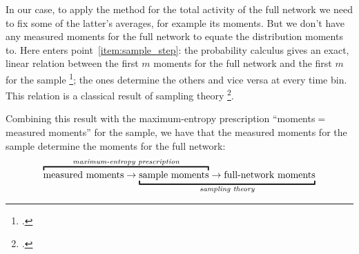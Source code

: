 \documentclass[\ifafour a4paper,12pt,\else a5paper,10pt,\fi%
onecolumn,oneside,article,%
british%
]{memoir}
\theoremstyle{remark}
\theoremstyle{innote}
\newcommand*{\citep}{\footcites}
\renewcommand*{\|}[1][]{\nonscript\,#1\vert\nonscript\;\mathopen{}}
\newcommand*{\chap}{ch.}%
\newcommand*{\chaps}{chs}%
\newcommand*{\eqns}{eqs}%
\begin{document}
In our case, to apply the method for the total activity of the full network
we need to fix some of the latter's averages, for example its moments. But
we don't have any measured moments for the full network to equate the
distribution moments to. Here enters point~\ref{item:sample_step}: the
probability calculus gives an exact, linear relation between the first $m$
moments for the full network and the first $m$ for the sample
\citep[\eqns~(16)]{portamanaetal2015}; the ones determine the others and
vice versa at every time bin. This relation is a classical result of
sampling theory
\citep[\chaps~I--IV]{whitworth1867_r1965}[\chap~II]{feller1950_r1968}[\chap~3]{jaynes1994_r2003}[see
also][]{whitworth1897}.

Combining this result with the maximum-entropy prescription
\enquote{moments${}={}$measured moments} for the sample, we have that the
measured moments for the sample determine the moments for the full network:
\begin{equation*}
  \label{eq:chain_prescription_moments}
  \mathrlap{\overbracket{\phantom{\text{measured moments} \rightarrow
        \text{sample moments}}}^{\textit{maximum-entropy prescription}}}
  \text{measured moments} \rightarrow
        \underbracket{\text{sample moments}
  \rightarrow
    \text{full-network moments}}_{\textit{sampling theory}}
\end{equation*}
\end{document}
